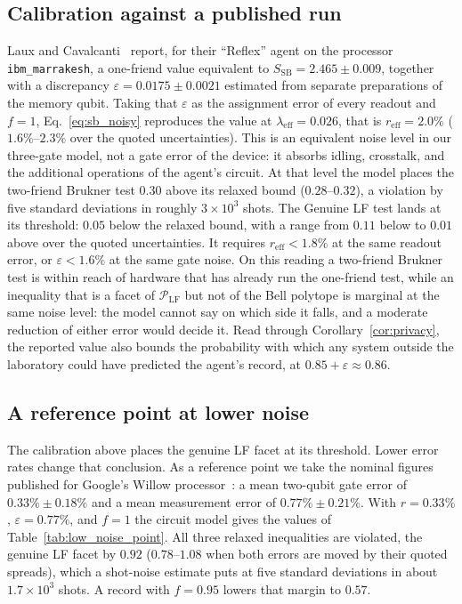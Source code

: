 \subsection{Calibration against a published run}
\label{sec:calibration}

Laux and Cavalcanti~\cite{laux2026} report, for their ``Reflex'' agent on the processor \texttt{ibm\_marrakesh}, a one-friend value equivalent to $S_{\mathrm{SB}} = 2.465 \pm 0.009$, together with a discrepancy $\varepsilon = 0.0175 \pm 0.0021$ estimated from separate preparations of the memory qubit. Taking that $\varepsilon$ as the assignment error of every readout and $f = 1$, Eq.~\eqref{eq:sb_noisy} reproduces the value at $\lambda_{\mathrm{eff}} = 0.026$, that is $r_{\mathrm{eff}} = 2.0\%$ ($1.6\%$--$2.3\%$ over the quoted uncertainties). This is an equivalent noise level in our three-gate model, not a gate error of the device: it absorbs idling, crosstalk, and the additional operations of the agent's circuit. At that level the model places the two-friend Brukner test $0.30$ above its relaxed bound ($0.28$--$0.32$), a violation by five standard deviations in roughly $3 \times 10^3$ shots. The Genuine LF test lands at its threshold: $0.05$ below the relaxed bound, with a range from $0.11$ below to $0.01$ above over the quoted uncertainties. It requires $r_{\mathrm{eff}} < 1.8\%$ at the same readout error, or $\varepsilon < 1.6\%$ at the same gate noise. On this reading a two-friend Brukner test is within reach of hardware that has already run the one-friend test, while an inequality that is a facet of $\mathcal{P}_{\mathrm{LF}}$ but not of the Bell polytope is marginal at the same noise level: the model cannot say on which side it falls, and a moderate reduction of either error would decide it. Read through Corollary~\ref{cor:privacy}, the reported value also bounds the probability with which any system outside the laboratory could have predicted the agent's record, at $0.85 + \varepsilon \approx 0.86$.

\subsection{A reference point at lower noise}
\label{sec:low_noise_point}

The calibration above places the genuine LF facet at its threshold. Lower error rates change that conclusion. As a reference point we take the nominal figures published for Google's Willow processor~\cite{willowspec2024,acharya2025}: a mean two-qubit gate error of $0.33\% \pm 0.18\%$ and a mean measurement error of $0.77\% \pm 0.21\%$. With $r = 0.33\%$, $\varepsilon = 0.77\%$, and $f = 1$ the circuit model gives the values of Table~\ref{tab:low_noise_point}. All three relaxed inequalities are violated, the genuine LF facet by $0.92$ ($0.78$--$1.08$ when both errors are moved by their quoted spreads), which a shot-noise estimate puts at five standard deviations in about $1.7 \times 10^3$ shots. A record with $f = 0.95$ lowers that margin to $0.57$.

